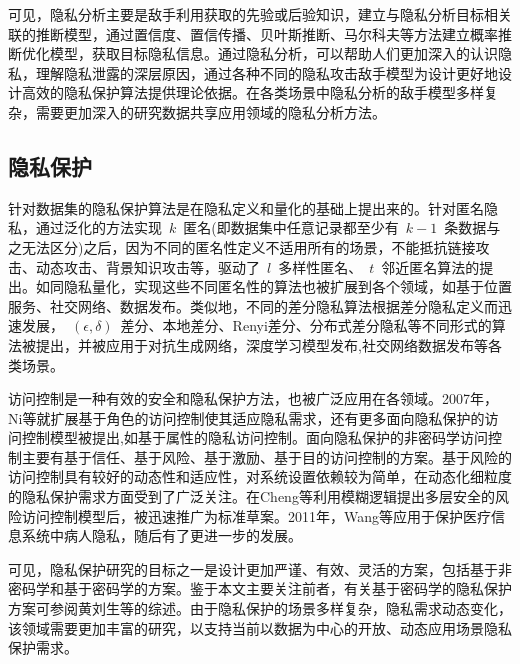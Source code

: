 可见，隐私分析主要是敌手利用获取的先验或后验知识，建立与隐私分析目标相关联的推断模型，通过置信度、置信传播、贝叶斯推断、马尔科夫等方法建立概率推断优化模型，获取目标隐私信息。通过隐私分析，可以帮助人们更加深入的认识隐私，理解隐私泄露的深层原因，通过各种不同的隐私攻击敌手模型为设计更好地设计高效的隐私保护算法提供理论依据。在各类场景中隐私分析的敌手模型多样复杂，需要更加深入的研究数据共享应用领域的隐私分析方法。

\subsection{隐私保护}

针对数据集的隐私保护算法是在隐私定义和量化的基础上提出来的。针对匿名隐私，通过泛化的方法实现~$k$~匿名\cite{sweeney2002k}(即数据集中任意记录都至少有~$k-1$~条数据与之无法区分)之后，因为不同的匿名性定义不适用所有的场景，不能抵抗链接攻击、动态攻击、背景知识攻击等，驱动了~$l$~多样性匿名\cite{machanavajjhala2007l}、~$t$~邻近匿名\cite{li2007t}算法的提出。如同隐私量化，实现这些不同匿名性的算法也被扩展到各个领域，如基于位置服务\cite{niu2014achieving}、社交网络\cite{campan2008data}、数据发布\cite{wong2006anonymity,ying2009comparisons}。类似地，不同的差分隐私算法根据差分隐私定义而迅速发展，~$(\epsilon,\delta)$~差分、本地差分\cite{kairouz2014extremal}、Renyi差分\cite{mironov2017renyi}、分布式差分隐私\cite{cheu2019distributed}等不同形式的算法被提出，并被应用于对抗生成网络\cite{xu2019ganobfuscator}，深度学习模型发布\cite{yu2019differentially},社交网络数据发布\cite{wang2018real}等各类场景。

访问控制是一种有效的安全和隐私保护方法，也被广泛应用在各领域\cite{li2017access}。2007年，Ni等\cite{ni2007privacy}就扩展基于角色的访问控制使其适应隐私需求，还有更多面向隐私保护的访问控制模型被提出,如基于属性的隐私访问控制\cite{edemacu2019privacy}。面向隐私保护的非密码学访问控制主要有基于信任\cite{wang2019game}、基于风险\cite{zhang2018privacy}、基于激励\cite{liu2011risk}、基于目的访问控制\cite{amini2019purpose}的方案。基于风险的访问控制具有较好的动态性和适应性，对系统设置依赖较为简单，在动态化细粒度的隐私保护需求方面受到了广泛关注。在Cheng等\cite{cheng2007fuzzy}利用模糊逻辑提出多层安全的风险访问控制模型后，被迅速推广为标准草案\cite{mcgraw2009risk}。2011年，Wang等\cite{wang2011quantified}应用于保护医疗信息系统中病人隐私，随后有了更进一步的发展\cite{zhang2018privacy,li2017access}。

可见，隐私保护研究的目标之一是设计更加严谨、有效、灵活的方案，包括基于非密码学和基于密码学的方案。鉴于本文主要关注前者，有关基于密码学的隐私保护方案可参阅黄刘生等\cite{huang2015review}的综述。由于隐私保护的场景多样复杂，隐私需求动态变化，该领域需要更加丰富的研究，以支持当前以数据为中心的开放、动态应用场景隐私保护需求。

